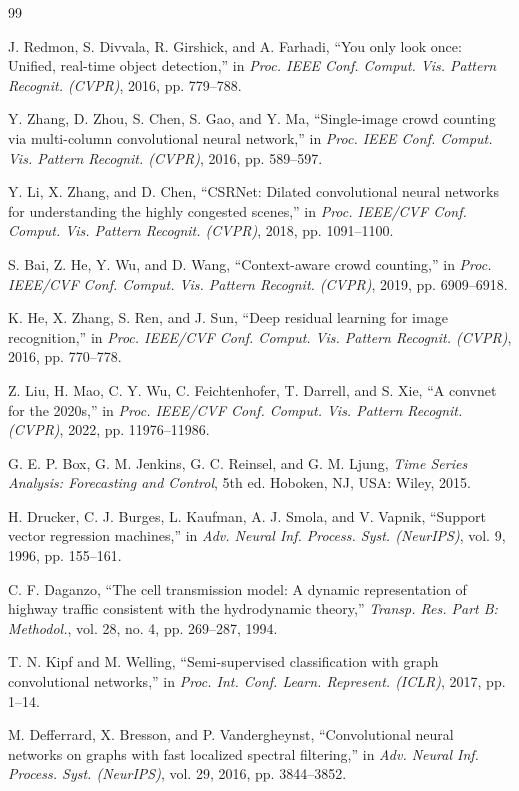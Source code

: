 \begin{thebibliography}{99}

J. Redmon, S. Divvala, R. Girshick, and A. Farhadi, ``You only look once: Unified, real-time object detection,'' in \emph{Proc. IEEE Conf. Comput. Vis. Pattern Recognit. (CVPR)}, 2016, pp. 779--788.

Y. Zhang, D. Zhou, S. Chen, S. Gao, and Y. Ma, ``Single-image crowd counting via multi-column convolutional neural network,'' in \emph{Proc. IEEE Conf. Comput. Vis. Pattern Recognit. (CVPR)}, 2016, pp. 589--597.

Y. Li, X. Zhang, and D. Chen, ``CSRNet: Dilated convolutional neural networks for understanding the highly congested scenes,'' in \emph{Proc. IEEE/CVF Conf. Comput. Vis. Pattern Recognit. (CVPR)}, 2018, pp. 1091--1100.

S. Bai, Z. He, Y. Wu, and D. Wang, ``Context-aware crowd counting,'' in \emph{Proc. IEEE/CVF Conf. Comput. Vis. Pattern Recognit. (CVPR)}, 2019, pp. 6909--6918.

K. He, X. Zhang, S. Ren, and J. Sun, ``Deep residual learning for image recognition,'' in \emph{Proc. IEEE/CVF Conf. Comput. Vis. Pattern Recognit. (CVPR)}, 2016, pp. 770--778.

Z. Liu, H. Mao, C. Y. Wu, C. Feichtenhofer, T. Darrell, and S. Xie, ``A convnet for the 2020s,'' in \emph{Proc. IEEE/CVF Conf. Comput. Vis. Pattern Recognit. (CVPR)}, 2022, pp. 11976--11986.

G. E. P. Box, G. M. Jenkins, G. C. Reinsel, and G. M. Ljung, \emph{Time Series Analysis: Forecasting and Control}, 5th ed. Hoboken, NJ, USA: Wiley, 2015.

H. Drucker, C. J. Burges, L. Kaufman, A. J. Smola, and V. Vapnik, ``Support vector regression machines,'' in \emph{Adv. Neural Inf. Process. Syst. (NeurIPS)}, vol. 9, 1996, pp. 155--161.

C. F. Daganzo, ``The cell transmission model: A dynamic representation of highway traffic consistent with the hydrodynamic theory,'' \emph{Transp. Res. Part B: Methodol.}, vol. 28, no. 4, pp. 269--287, 1994.

T. N. Kipf and M. Welling, ``Semi-supervised classification with graph convolutional networks,'' in \emph{Proc. Int. Conf. Learn. Represent. (ICLR)}, 2017, pp. 1--14.

M. Defferrard, X. Bresson, and P. Vandergheynst, ``Convolutional neural networks on graphs with fast localized spectral filtering,'' in \emph{Adv. Neural Inf. Process. Syst. (NeurIPS)}, vol. 29, 2016, pp. 3844--3852.


\end{thebibliography}
